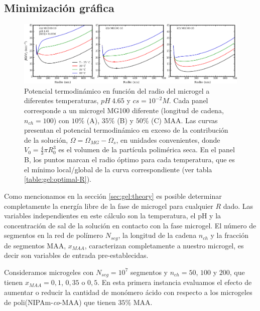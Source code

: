\subsection{Minimizaci\'on gr\'afica}\label{sec:gel:minimi}

\begin{figure}[!htb]
\centering
\includegraphics[width=1.\linewidth]{Figures/graph-gel/graph-min.pdf}
\caption{Potencial termodin\'amico en funci\'on del radio del microgel a diferentes temperaturas, $pH~4.65$ y $cs=10^{-2}M$.
	Cada panel corresponde a un microgel MG100 diferente (longitud de cadena, $n_{ch}=100$) con $10\%$ (A), $35\%$ (B) y $50\%$ (C) MAA.
	Las curvas presentan el potencial termodin\'amico en exceso de la contribuci\'on de la soluci\'on, $\Omega=\Omega_{MG}-\Omega_s$, en unidades convenientes, donde $V_0=\frac{4}{3}\pi R_0^3$ es el volumen de la part\'icula polim\'erica seca.
	En el panel B, los puntos  marcan el radio \'optimo para cada temperatura, que es el m\'inimo local/global de la curva correspondiente (ver tabla \ref{table:gel:optimal-R}).}
\label{fig:gel:graph-min}
\end{figure}

Como mencionamos en la secci\'on \ref{sec:gel:theory} es posible determinar completamente la energ\'ia libre de la fase de microgel para cualquier $R$ dado.
Las variables independientes en este c\'alculo son la temperatura, el pH y la concentraci\'on de sal de la soluci\'on en contacto con la fase microgel.
El n\'umero de segmentos en la red de pol\'imero $N_{seg}$, la longitud de la cadena $n_{ch}$ y la fracci\'on de segmentos MAA, $x_{MAA}$, caracterizan completamente a nuestro microgel, es decir son variables de entrada pre-establecidas.


Consideramos microgeles con $N_{seg}=10^7$ segmentos y $n_{ch}=50$, $100$ y $200$, que tienen $x_{MAA}=0,1$, $0,35$ o $0,5$.
En esta primera instancia evaluamos el efecto de aumentar o reducir la cantidad de mon\'omero \'acido con respecto a los microgeles de poli(NIPAm-\emph{co}-MAA) que tienen $35\%$ MAA.

